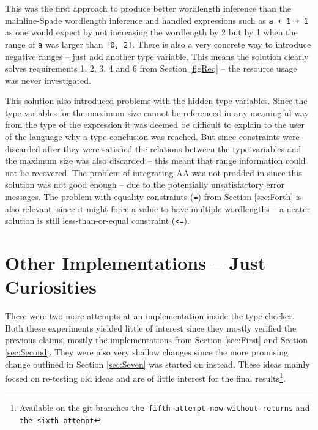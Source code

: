 This was the first approach to produce better wordlength inference than the mainline-Spade wordlength inference and handled expressions such as \verb!a + 1 + 1! as one would expect by not increasing the wordlength by 2 but by 1 when the range of \verb+a+ was larger than \verb+[0, 2]+. There is also a very concrete way to introduce negative ranges -- just add another type variable. This means the solution clearly solves requirements 1, 2, 3, 4 and 6 from Section \ref{figReq} -- the resource usage was never investigated.

This solution also introduced problems with the hidden type variables. Since the type variables for the maximum size cannot be referenced in any meaningful way from the type of the expression it was deemed be difficult to explain to the user of the language why a type-conclusion was reached. But since constraints were discarded after they were satisfied the relations between the type variables and the maximum size was also discarded -- this meant that range information could not be recovered. The problem of integrating AA was not prodded in since this solution was not good enough -- due to the potentially unsatisfactory error messages. The problem with equality constraints (\verb+=+) from Section \ref{sec:Forth} is also relevant, since it might force a value to have multiple wordlengths -- a neater solution is still less-than-or-equal constraint (\verb+<=+).

\section{Other Implementations -- Just Curiosities}
\label{sec:Other}

There were two more attempts at an implementation inside the type checker. Both these experiments yielded little of interest since they mostly verified the previous claims, mostly the implementations from Section \ref{sec:First} and Section \ref{sec:Second}. They were also very shallow changes since the more promising change outlined in Section \ref{sec:Seven} was started on instead. These ideas mainly focsed on re-testing old ideas and are of little interest for the final results\cprotect\footnote{Available on the git-branches \verb+the-fifth-attempt-now-without-returns+ and \verb+the-sixth-attempt+}.


